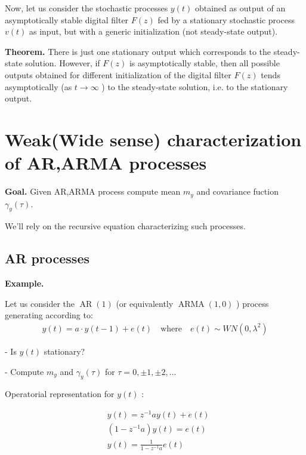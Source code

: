 Now, let us consider the stochastic processes $y(t)$ obtained as output of an asymptotically stable digital filter $F(z)$ fed by a stationary stochastic process $v(t)$ as input, but with a generic initialization (not steady-state output).


\textbf{Theorem.} There is just one stationary output which corresponds to the steady-state solution. However, if $F(z)$ is asymptotically stable, then all possible outputs obtained for different initialization of the digital filter $F(z)$ tends asymptotically (as $t \rightarrow \infty$ ) to the steady-state solution, i.e. to the stationary output.


\section{Weak(Wide sense) characterization of AR,ARMA processes}
\textbf{Goal.} Given AR,ARMA process compute mean $m_y$ and covariance fuction $\gamma_y(\tau)$.


We'll rely on the recursive equation characterizing such processes.

\subsection{AR processes}
\textbf{Example.}

Let us consider the $\operatorname{AR}(1)$ (or equivalently $\operatorname{ARMA}(1,0)$ ) process generating according to:
\begin{align*}
	y(t)=a \cdot y(t-1)+e(t) \quad \text{where} \quad e(t) \sim W N\left(0, \lambda^{2}\right)
\end{align*}

- Is $y(t)$ stationary?

- Compute $m_{y}$ and $\gamma_{y}(\tau)$ for $\tau=0, \pm 1, \pm 2, \ldots$

Operatorial representation for $y(t)$ :

\begin{align*}
	&y(t)=z^{-1} a y(t)+e(t) \\
	&\left(1-z^{-1} a\right) y(t)=e(t) \\
	&y(t)=\frac{1}{1-z^{-1} a} e(t)
\end{align*}

